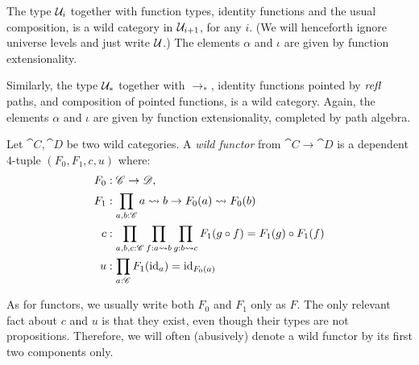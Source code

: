 \documentclass[english,a4]{article}
\newcommand{\ptdto}{\to_\ast}%
\newcommand{\UUptd}{\UU_{\ast}}
\begin{document}
\begin{example}
  The type $\mathcal{U}_i$ together with function types, identity functions and the
	usual composition, is a wild category in $\mathcal{U}_{i+1}$, for any $i$. (We will henceforth ignore universe levels and just write $\mathcal{U}$.) The elements $\alpha$ and $\iota$ are
  given by function extensionality.
 
  Similarly, the type $\UUptd$ together with $\ptdto$, identity functions
  pointed by $\mathop{{\mathit{refl}}_{}}$ paths, and composition of pointed functions, is a wild
  category. Again, the elements $\alpha$ and $\iota$ are given by function
  extensionality, completed by path algebra.
\end{example}

\begin{definition}
  Let $\cat C,\cat D$ be two wild categories.
  A \emph{wild functor} from $\cat C \to \cat D$ is a dependent $4$-tuple $(F_0,F_1,c,u)$ where:
  \begin{align*}
    F_0 &:\cat C \to \cat D,\\
    F_1 &:\prod_{a,b:\cat C} \hom(a,b) \to \hom(F_0(a), F_0(b))\\
    c &: \prod_{a,b,c:\cat C}\prod_{f:\hom(a,b)}\prod_{g:\hom(b,c)}F_1(g\circ f) = F_1(g) \circ F_1(f)\\
    u &: \prod_{a:\cat C} F_1(\id_a) = \id_{F_0(a)}
  \end{align*}
  \label{def:wild-functor}
\end{definition}

As for functors, we usually write both $F_0$ and $ F_1$ only as $F$. The only
relevant fact about $c$ and $u$ is that they exist, even though their types are
not propositions. Therefore, we will often (abusively) denote a wild functor by
its first two components only.
\end{document}
